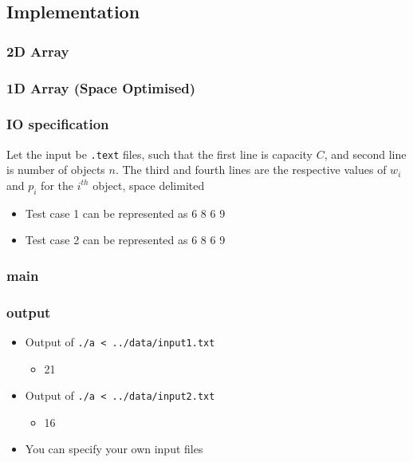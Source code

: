 \documentclass{beamer}
\begin{document}
\subsection{Implementation}
\begin{frame}
	\frametitle{2D Array}
  
\end{frame}

\begin{frame}
	\frametitle{1D Array (Space Optimised)}
  
\end{frame}

\begin{frame}
  \frametitle{IO specification}
  Let the input be \texttt{.text} files, such that the first line is capacity $C$, and second line is number of objects $n$. The third and fourth lines are the respective values of $w_i$ and $p_i$  for the $i^{th}$ object, space delimited
  \begin{itemize}
    \item Test case 1 can be represented as  6 8 6 9\newline
    \item Test case 2 can be represented as  6 8 6 9\newline
  \end{itemize}
\end{frame}

\begin{frame}
	\frametitle{main}
  
\end{frame}

\begin{frame}
  \frametitle{output}
  \begin{itemize}
    \item Output of \texttt{./a < ../data/input1.txt}
      \begin{itemize}
        \item 21
      \end{itemize}
    \item Output of \texttt{./a < ../data/input2.txt}
      \begin{itemize}
        \item 16 
      \end{itemize}
	 \item You can specify your own input files
  \end{itemize}
\end{frame}
\end{document}
